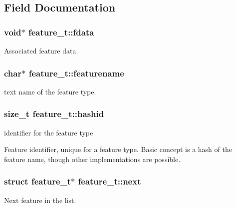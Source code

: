 \subsection{Field Documentation}
\subsubsection[{\texorpdfstring{fdata}{fdata}}]{\setlength{\rightskip}{0pt plus 5cm}void$\ast$ feature\+\_\+t\+::fdata}\hypertarget{structfeature__t_a363d3009c71db9c2294f5227ce186649}{}\label{structfeature__t_a363d3009c71db9c2294f5227ce186649}
Associated feature data. 
\subsubsection[{\texorpdfstring{featurename}{featurename}}]{\setlength{\rightskip}{0pt plus 5cm}char$\ast$ feature\+\_\+t\+::featurename}\hypertarget{structfeature__t_a2d4a7e92af0cf4e2bdfc04ec3fb60fb5}{}\label{structfeature__t_a2d4a7e92af0cf4e2bdfc04ec3fb60fb5}


text name of the feature type. 

\subsubsection[{\texorpdfstring{hashid}{hashid}}]{\setlength{\rightskip}{0pt plus 5cm}size\+\_\+t feature\+\_\+t\+::hashid}\hypertarget{structfeature__t_a9622cb072e66eb7ad9dd21feeaf8991c}{}\label{structfeature__t_a9622cb072e66eb7ad9dd21feeaf8991c}


identifier for the feature type 

Feature identifier, unique for a feature type. Basic concept is a hash of the feature name, though other implementations are possible. 
\subsubsection[{\texorpdfstring{next}{next}}]{\setlength{\rightskip}{0pt plus 5cm}struct {\bf feature\+\_\+t}$\ast$ feature\+\_\+t\+::next}\hypertarget{structfeature__t_ab77c0648e065a1f6063e5c81615a6698}{}\label{structfeature__t_ab77c0648e065a1f6063e5c81615a6698}
Next feature in the list. 
